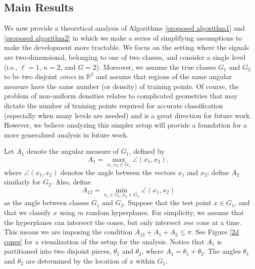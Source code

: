 \documentclass[twoside,11pt]{article}
\def \R {\mathbb{R}}
\newcommand{\edit}[1]{{{#1}}}
\begin{document}
\subsection{Main Results}
We now provide a theoretical analysis of Algorithms \ref{proposed algorithm1} and \ref{proposed algorithm2} in which we make a series of simplifying assumptions to make the development more tractable.
We focus on the setting where the signals are two-dimensional, belonging to one of two classes, and consider a single \edit{level} (i.e., $\ell=1$, $n=2$, and $G=2$). 
Moreover, we assume the true classes $G_1$ and $G_2$ to be two disjoint \textit{cones} in $\R^2$ and assume that regions of the same angular measure have the same number (or density) of training points. \edit{Of course, the problem of non-uniform densities relates to complicated geometries that may dictate the number of training points required for accurate classification (especially when many levels are needed) and is a great direction for future work. However, we} believe analyzing this simpler setup will provide a foundation for a more generalized analysis in future work. 

Let $A_1$ denote the angular measure of $G_1$, defined by \[A_1 = \max_{x_1, x_2\in G_1} \angle(x_1,x_2),\] where $\angle(x_1,x_2)$ denotes the angle between the vectors $x_1$ and $x_2$; define $A_2$ similarly for $G_2$.  Also, define \[A_{12} = \min_{x_1\in G_1, x_2\in G_2} \angle(x_1,x_2)\] as the angle between classes $G_1$ and $G_2$. Suppose that the test point $x\in G_1$, and  that we classify $x$ using $m$ random hyperplanes. For simplicity, we assume that the hyperplanes can intersect the cones, but only intersect \textit{one} cone at a time. This means we are imposing the condition $A_{12} + A_1 + A_2 \leq \pi$. See Figure \ref{2d cones} for a visualization of the setup for the analysis. Notice that $A_1$ is partitioned into two disjoint pieces, $\theta_1$ and $\theta_2$, where $A_1 = \theta_1+\theta_2$. The angles $\theta_1$ and $\theta_2$ are determined by the location of $x$ within $G_1$. 
\end{document}
